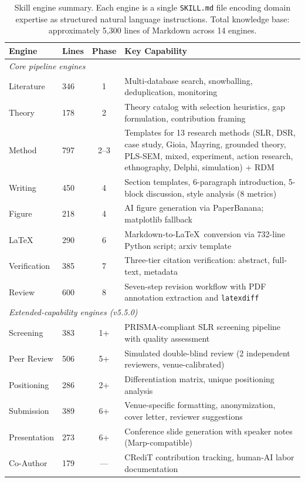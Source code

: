 \documentclass{article}
\begin{document}
\begin{table}[t]
\centering
\caption{Skill engine summary. Each engine is a single \texttt{SKILL.md} file encoding domain expertise as structured natural language instructions. Total knowledge base: approximately 5,300 lines of Markdown across 14 engines.}
\label{tab:engines}
\begin{tabularx}{\textwidth}{llcX}
\toprule
\textbf{Engine} & \textbf{Lines} & \textbf{Phase} & \textbf{Key Capability} \\
\midrule
\multicolumn{4}{l}{\emph{Core pipeline engines}} \\
Literature & 346 & 1 & Multi-database search, snowballing, deduplication, monitoring \\
Theory & 178 & 2 & Theory catalog with selection heuristics, gap formulation, contribution framing \\
Method & 797 & 2--3 & Templates for 13 research methods (SLR, DSR, case study, Gioia, Mayring, grounded theory, PLS-SEM, mixed, experiment, action research, ethnography, Delphi, simulation) + RDM \\
Writing & 450 & 4 & Section templates, 6-paragraph introduction, 5-block discussion, style analysis (8 metrics) \\
Figure & 218 & 4 & AI figure generation via PaperBanana; matplotlib fallback \\
\LaTeX & 290 & 6 & Markdown-to-\LaTeX\ conversion via 732-line Python script; arxiv template \\
Verification & 385 & 7 & Three-tier citation verification: abstract, full-text, metadata \\
Review & 600 & 8 & Seven-step revision workflow with PDF annotation extraction and \texttt{latexdiff} \\
\midrule
\multicolumn{4}{l}{\emph{Extended-capability engines (v5.5.0)}} \\
Screening & 383 & 1+ & PRISMA-compliant SLR screening pipeline with quality assessment \\
Peer Review & 506 & 5+ & Simulated double-blind review (2 independent reviewers, venue-calibrated) \\
Positioning & 286 & 2+ & Differentiation matrix, unique positioning analysis \\
Submission & 389 & 6+ & Venue-specific formatting, anonymization, cover letter, reviewer suggestions \\
Presentation & 273 & 6+ & Conference slide generation with speaker notes (Marp-compatible) \\
Co-Author & 179 & --- & CRediT contribution tracking, human-AI labor documentation \\
\bottomrule
\end{tabularx}
\end{table}
\end{document}
